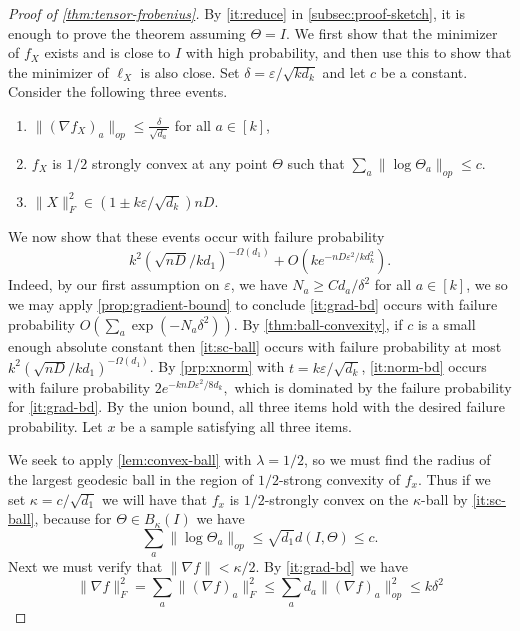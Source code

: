 \documentclass[aos]{imsart}
\theoremstyle{definition}
\numberwithin{equation}{section}
\newcommand{\eps}{\varepsilon}
\newcommand{\samp}{x}
\newcommand{\rv}{X}
\newcommand{\CF}[1]{{\color{purple}[CF: #1]}}
\begin{document}
\begin{proof}[Proof of \cref{thm:tensor-frobenius}]By \cref{it:reduce} in \cref{subsec:proof-sketch}, it is enough to prove the theorem assuming $\Theta = I$. We first show that the minimizer of $f_\rv$ exists and is close to $I$ with high probability, and then use this to show that the minimizer of $\ell_\rv$ is also close.  Set $\delta = \eps/\sqrt{k d_k}$ and let $c$ be a constant. Consider the following three events.
\begin{enumerate}
\item\label{it:grad-bd} $\|(\nabla f_\rv)_{a}\|_{op} \leq \frac{\delta}{\sqrt{d_{a}}}$ for all $a \in [k]$,
\item\label{it:sc-ball} $f_\rv$ is $1/2$ strongly convex at any point $\Theta$ such that $\sum_a \|\log \Theta_a\|_{op} \leq  c.$
\item\label{it:norm-bd} $\| \rv\|_F^2 \in (1 \pm k \eps/\sqrt{d_k}) nD.$
\end{enumerate}
We now show that these events occur with failure probability $$k^2 \left(\sqrt{nD} / kd_1 \right)^{ - \Omega(d_1)} + O(k e^{ - nD \eps^2 / k d_k^2}).$$ Indeed, by our first assumption on $\eps$, we have $N_a \geq C d_a/\delta^2$ for all $a \in [k]$, we so we may apply \cref{prop:gradient-bound} to conclude \cref{it:grad-bd} occurs with failure probability $O\left( \sum_a \exp ( - N_a \delta^2)\right)$.
By \cref{thm:ball-convexity}, if $c$ is a small enough absolute constant then \cref{it:sc-ball} occurs with failure probability at most $k^2 \left(\sqrt{nD} / kd_1 \right)^{ - \Omega(d_1)}$. By \cref{prp:xnorm} with $t = k \eps/\sqrt{d_k}$, \cref{it:norm-bd} occurs with failure probability $2e^{- k nD \eps^2/8 d_k},$ which is dominated by the failure probability for \cref{it:grad-bd}. By the union bound, all three items hold with the desired failure probability. Let $\samp$ be a sample satisfying all three items.


We seek to apply \cref{lem:convex-ball} with $\lambda = 1/2$, so we must find the radius of the largest geodesic ball in the region of $1/2$-strong convexity of $f_\samp$. Thus if we set $\kappa = c/\sqrt{d_1}$ we will have that $f_\samp$ is $1/2$-strongly convex on the $\kappa$-ball by \cref{it:sc-ball}, because for $\Theta \in B_\kappa(I)$ we have
$$ \sum_a \|\log \Theta_a\|_{op} \leq \sqrt{d_1} d(I, \Theta) \leq c.$$
Next we must verify that $\|\nabla f\| < \kappa/2$. By \cref{it:grad-bd} we have
\[  \|\nabla f\|_F^{2} = \sum_{a} \|(\nabla f)_{a}\|_{F}^{2} \leq \sum_{a} d_a \|(\nabla f)_{a}\|_{op}^{2} \leq  k \delta^{2} \]


\end{proof}
\end{document}
